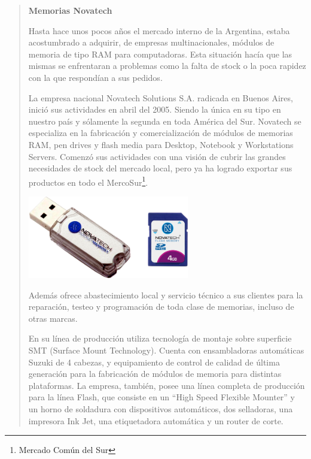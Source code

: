 \documentclass[%
  	final,
%
	notitlepage,
	narroweqnarray,
	inline,
 	twoside,
	]{ieee}
\begin{document}
\begin{quote}
\textbf{Memorias Novatech}

\textbf{ }

Hasta hace unos pocos a\~nos el mercado interno de la Argentina, estaba acostumbrado a adquirir, de empresas multinacionales, m\'odulos de memoria de tipo RAM para computadoras. Esta situaci\'on hac\'ia que las mismas se enfrentaran a problemas como la falta de stock o la poca rapidez con la que respond\'ian a sus pedidos.

La empresa nacional Novatech Solutions S.A. radicada en Buenos Aires, inici\'o sus actividades en abril del 2005. Siendo la \'unica en su tipo en nuestro pa\'is y s\'olamente la segunda en toda Am\'erica del Sur. Novatech se especializa en la fabricaci\'on y comercializaci\'on de m\'odulos de memorias RAM, pen drives y flash media para Desktop, Notebook y Workstations Servers. Comenz\'o sus actividades con una visi\'on de cubrir las grandes necesidades de stock del mercado local, pero ya ha logrado exportar sus productos en todo el MercoSur\footnote{Mercado Com\'un del Sur\cite{mercosur}}.\\

\begin{center}\includegraphics[width=200pt, height=102pt]{novatech.png}\end{center}%

\textbf{ }

Adem\'as ofrece abastecimiento local y servicio t\'ecnico a sus clientes para la reparaci\'on, testeo y programaci\'on de toda clase de memorias, incluso de otras marcas. 

En su l\'inea de producci\'on utiliza tecnolog\'ia de montaje sobre superficie SMT (Surface Mount Technology). Cuenta con ensambladoras autom\'aticas Suzuki de 4 cabezas, y equipamiento de control de calidad de \'ultima generaci\'on para la fabricaci\'on de m\'odulos de memoria para distintas plataformas. La empresa, tambi\'en, posee una l\'inea completa de producci\'on para la l\'inea Flash, que consiste en un ``High Speed Flexible Mounter'' y un horno de soldadura con dispositivos autom\'aticos, dos selladoras, una impresora Ink Jet, una etiquetadora autom\'atica y un router de corte.


\end{quote}
\end{document}
